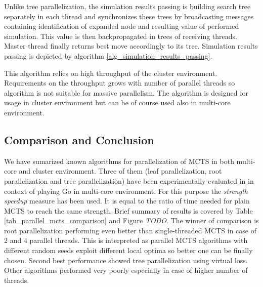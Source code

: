 Unlike tree parallelization, the simulation results passing is building search tree separately in
each thread and synchronizes these trees by broadcasting messages containing identification of
expanded node and resulting value of performed simulation. This value is then backpropagated in
trees of receiving threads. Master thread finally returns best move accordingly to its tree.
Simulation results passing is depicted by algorithm \ref{alg_simulation_results_passing}.

This algorithm relies on high throughput of the cluster environment. Requirements on the throughput
grows with number of parallel threads so algorithm is not suitable for massive parallelism. The
algorithm is designed for usage in cluster environment but can be of course used also in multi-core
environment.


\subsection{Comparison and Conclusion}

We have sumarized known algorithms for parallelization of MCTS in both multi-core and cluster
environment. Three of them (leaf parallelization, root parallelization and tree
parallelization)
have been experimentally evaluated in \cite{Chaslot2008} in context of playing Go in multi-core
environment. For this purpose the \emph{strength speedup} measure has been used. It is equal to
 the ratio of time needed for plain
MCTS to reach the same strength. Brief summary of results is covered by Table
\ref{tab_parallel_mcts_comparison} and Figure \emph{TODO}. The winner of comparison is root parallelization performing even
better than single-threaded MCTS in case of 2 and 4 parallel threads. This is interpreted as 
parallel MCTS algorithms with different random seeds exploit different local optima so better one
can be finally chosen. Second best performance showed tree parallelization using virtual loss. Other
algorithms performed very poorly especially in case of higher number of threads.


